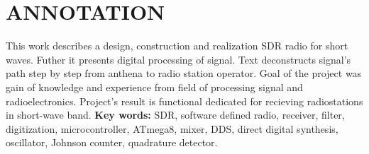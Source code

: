 \section*{ANNOTATION}
\indent\indent This work describes a design, construction and realization SDR radio for short waves. Futher it presents digital processing of signal. Text deconstructs signal's path step by step from anthena to radio station operator. Goal of the project was gain of knowledge and experience from field of processing signal and radioelectronics. Project's result is functional dedicated for recieving radiostations in short-wave band.
\newline\newline
\noindent\textbf{Key words:}
SDR, software defined radio, receiver, filter, digitization, microcontroller, ATmega8, mixer, DDS, direct digital synthesis, oscillator, Johnson counter, quadrature detector.

\vspace*{\fill}
	
